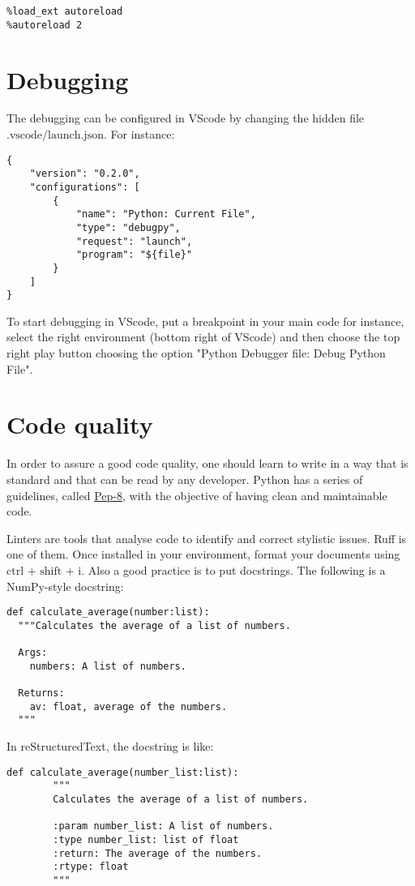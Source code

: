 \documentclass[24pt]{article}
\begin{document}
\begin{lstlisting}
%load_ext autoreload
%autoreload 2
\end{lstlisting}



  
\section{Debugging}

The debugging can be configured in VScode by changing the hidden file $\text{.vscode/launch.json}$. For instance:
\begin{lstlisting}
{
    "version": "0.2.0",
    "configurations": [
        {
            "name": "Python: Current File",
            "type": "debugpy",
            "request": "launch",
            "program": "${file}"
        }
    ]
}
\end{lstlisting}

To start debugging in VScode, put a breakpoint in your main code for instance, select the right environment (bottom right of VScode) and then choose the top right play button choosing the option "Python Debugger file: Debug Python File".


\section{Code quality}

In order to assure a good code quality, one should learn to write in a way that is standard and that can be read by any developer. Python has a series of guidelines, called  \href{https://peps.python.org/pep-0008/}{Pep-8}, with the  objective of having clean and maintainable code.


Linters are tools that analyse code to identify and correct stylistic issues. Ruff is one of them. Once installed in your environment, format your documents using $\text{ctrl + shift + i}$.
Also a good practice is to put docstrings. The following is a  NumPy-style docstring:

\begin{lstlisting}
def calculate_average(number:list):
  """Calculates the average of a list of numbers.

  Args:
    numbers: A list of numbers.

  Returns:
    av: float, average of the numbers.
  """
\end{lstlisting}

In reStructuredText, the docstring is like:

\begin{lstlisting}
def calculate_average(number_list:list):
        """
        Calculates the average of a list of numbers.

        :param number_list: A list of numbers.
        :type number_list: list of float
        :return: The average of the numbers.
        :rtype: float
        """
\end{lstlisting}
\end{document}
